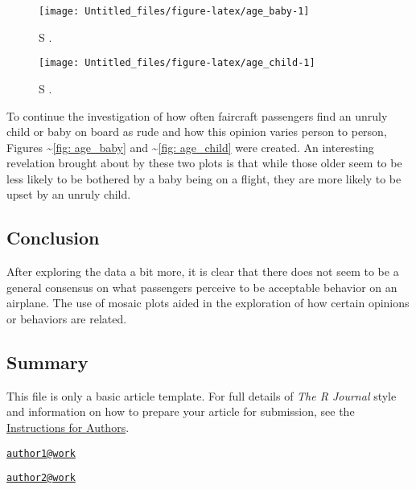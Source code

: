 \begin{Schunk}
\begin{figure}[h]
\texttt{[image: Untitled\_files/figure-latex/age\_baby-1]} \caption[S ]{S .}\label{fig:age_baby}
\end{figure}
\end{Schunk}

\begin{Schunk}
\begin{figure}[h]
\texttt{[image: Untitled\_files/figure-latex/age\_child-1]} \caption[S ]{S .}\label{fig:age_child}
\end{figure}
\end{Schunk}

To continue the investigation of how often faircraft passengers find an
unruly child or baby on board as rude and how this opinion varies person
to person, Figures \textasciitilde{}\ref{fig: age_baby} and
\textasciitilde{}\ref{fig: age_child} were created. An interesting
revelation brought about by these two plots is that while those older
seem to be less likely to be bothered by a baby being on a flight, they
are more likely to be upset by an unruly child.

\subsection{Conclusion}\label{conclusion}

After exploring the data a bit more, it is clear that there does not
seem to be a general consensus on what passengers perceive to be
acceptable behavior on an airplane. The use of mosaic plots aided in the
exploration of how certain opinions or behaviors are related.

\subsection{Summary}\label{summary}

This file is only a basic article template. For full details of
\emph{The R Journal} style and information on how to prepare your
article for submission, see the
\href{https://journal.r-project.org/share/author-guide.pdf}{Instructions
for Authors}.



\address{%
Haley Jeppson\\
Iowa State University\\
line 1\\ line 2\\
}
\href{mailto:author1@work}{\nolinkurl{author1@work}}

\address{%
Heike Hofmann\\
Iowa State University\\
line 1\\ line 2\\
}
\href{mailto:author2@work}{\nolinkurl{author2@work}}

